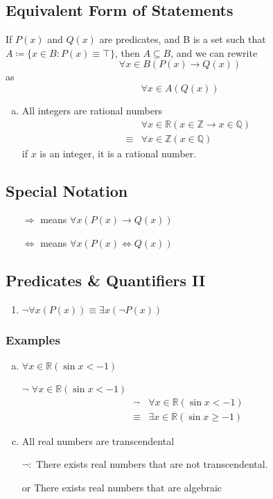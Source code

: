 \documentclass[12pt]{book}
\newcommand{\T}[0]{\top}
\newcommand{\Z}{\mathbb{Z}}
\newcommand{\R}{\mathbb{R}}
\newcommand{\Q}{\mathbb{Q}}
\newcommand{\paren}[1]{\left( #1 \right)}
\begin{document}
\subsection{Equivalent Form of Statements}
If $P(x)$ and $Q(x)$ are predicates, and B is a set such that $A\coloneqq \{ x\in B : P(x) \equiv \T \}$, then $A \subseteq B$, and we can rewrite
\[
\forall x \in B \paren{P(x) \rightarrow Q(x)}
\]
as
\[
\forall x \in A \paren{Q(x)}
\]
\begin{enumerate}[a.]
    \item All integers are rational numbers
        \begin{align*}
                    &\forall x \in \R \paren{x \in \Z \rightarrow x \in \Q}\\
            \equiv  & \forall x \in \Z \paren{x \in \Q}
        \end{align*}
        if $x$ is an integer, it is a rational number.
    
\end{enumerate}
\subsection{Special Notation}
\begin{enumerate}
    \item[$\Rightarrow$] means $\forall x \paren{ P(x) \rightarrow Q(x)}$
    \item[$\iff$] means $\forall x \paren{ P(x) \iff Q(x)}$
\end{enumerate}

\subsection{Predicates \& Quantifiers II}
\begin{enumerate}
    \item $\neg \forall x(P(x)) \equiv \exists x (\neg P(x))$ 
\end{enumerate}
\subsubsection{Examples}
    \begin{enumerate}[a.]
        \item $\forall x \in \R (\sin x < -1)$\\
        \item[$\neg$] $\forall x \in \R (\sin x < -1)$
             \begin{align*}
                 \neg    & \forall x \in \R (\sin x < -1)\\
                 \equiv  & \exists x \in \R (\sin x \geq -1)
             \end{align*}
         \item All real numbers are transcendental 
         \item[$\neg :$] There exists real numbers that are not transcendental.
         \item[or] There exists real numbers that are algebraic
    \end{enumerate}
\newpage
\end{document}
